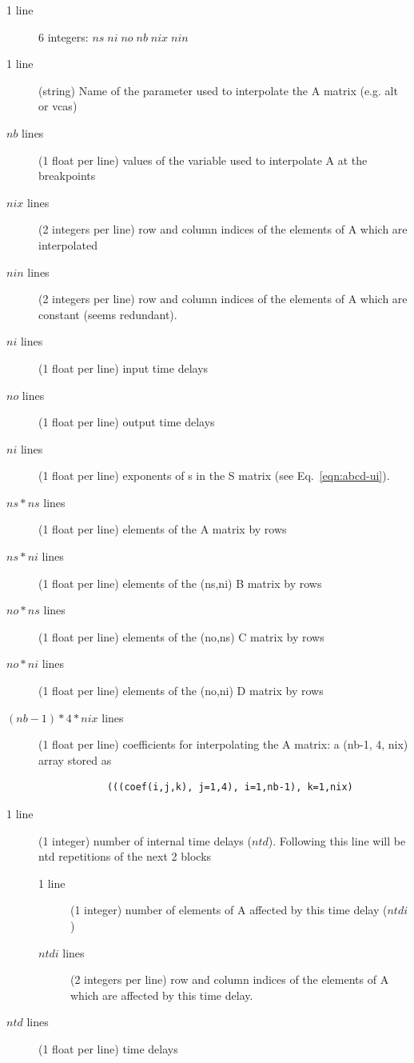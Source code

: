 \documentclass[10pt,openany,twoside]{book}
\numberwithin{equation}{section}   %
\newcommand{\Eqn}[1]{Eq.\ \ref{#1}}
\begin{document}
\begin{description}
	\item[1 line] 6 integers: $ns\; ni\; no\; nb\; nix\; nin$
	\item[1 line] (string) Name of the parameter used to interpolate the
		A matrix (e.g. alt or vcas)
	\item[$nb$ lines] (1 float per line) values of the variable used
                to interpolate A at the breakpoints
	\item[$nix$ lines] (2 integers per line) row and column indices of the elements
                of A which are interpolated
	\item[$nin$ lines] (2 integers per line) row and column indices of the elements
                of A which are constant (seems redundant).
	\item[$ni$ lines] (1 float per line) input time delays
	\item[$no$ lines] (1 float per line) output time delays
	\item[$ni$ lines] (1 float per line) exponents of s in the S matrix
                (see \Eqn{eqn:abcd-ui}).
   \item[$ns*ns$ lines] (1 float per line) elements of the A matrix by rows
	\item[$ns*ni$ lines] (1 float per line) elements of the (ns,ni) B matrix by rows
   \item[$no*ns$ lines] (1 float per line) elements of the (no,ns) C matrix by rows
	\item[$no*ni$ lines] (1 float per line) elements of the (no,ni) D matrix by rows
	\item[$(nb-1)*4*nix$ lines] (1 float per line) coefficients for interpolating
                the A matrix: a (nb-1, 4, nix) array stored as
			\nopagebreak
			{\scriptsize \ttfamily
			\begin{verbatim}
			(((coef(i,j,k), j=1,4), i=1,nb-1), k=1,nix)
			\end{verbatim}
			}
			\nopagebreak
	\item[1 line] (1 integer) number of internal time delays ($ntd$). Following
				this line will be ntd repetitions of the next 2 blocks
	\begin{description}
		\item[1 line] (1 integer) number of elements of A affected by this
				time delay ($ntdi$)
		\item[$ntdi$ lines] (2 integers per line) row and column indices of the elements
                of A which are affected by this time delay.
	\end{description}
	\item[$ntd$ lines] (1 float per line) time delays
\end{description}
\end{document}
